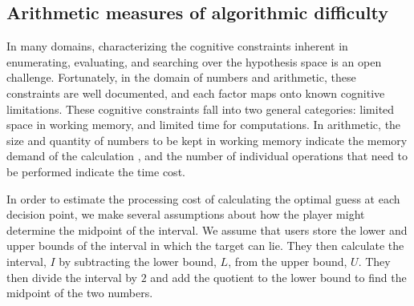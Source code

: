 \documentclass[10pt,letterpaper]{article}
\begin{document}
\subsection{Arithmetic measures of algorithmic difficulty}

In many domains, characterizing the cognitive constraints inherent in enumerating, evaluating, and searching over the hypothesis space is an open challenge. Fortunately, in the domain of numbers and arithmetic, these constraints are well documented, and each factor maps onto known cognitive limitations.
These cognitive constraints fall into two general categories: limited space in working memory, and limited time for computations. 
In arithmetic, the size and quantity of numbers to be kept in working memory indicate the memory demand of the calculation \cite{DEHAENE2003145}, and the number of individual operations that need to be performed indicate the time cost.

In order to estimate the processing cost of calculating the optimal guess at each decision point, we make several assumptions about how the player might determine the midpoint of the interval. We assume that users store the lower and upper bounds of the interval in which the target can lie. They then calculate the interval, $I$ by subtracting the lower bound, $L$, from the upper bound, $U$. They then divide the interval by $2$ and add the quotient to the lower bound to find the midpoint of the two numbers. 

\end{document}
